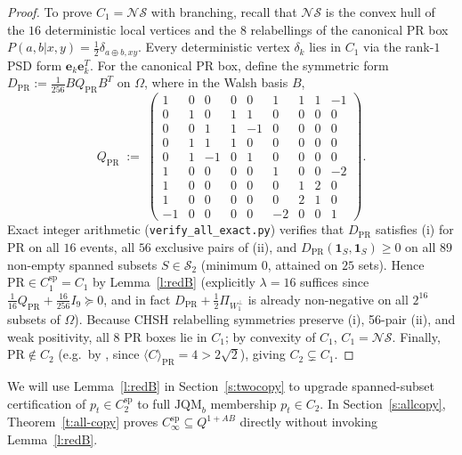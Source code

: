 \documentclass[11pt,a4paper]{article}
\theoremstyle{definition}
\theoremstyle{remark}
\newcommand{\PR}{\mathrm{PR}}
\newcommand{\ind}[1]{\mathbf{1}_{#1}}
\newcommand{\JQMb}{\mathrm{JQM}_b}
\newcommand{\QAB}{Q^{1+AB}}
\newcommand{\NS}{\mathcal{NS}}
\begin{document}
\begin{proof}
To prove $C_1 = \NS$ with branching, recall that $\NS$ is the convex hull of the $16$ deterministic local vertices and the $8$ relabellings of the canonical $\PR$ box $P(a,b|x,y) = \frac{1}{2}\delta_{a \oplus b, xy}$. Every deterministic vertex $\delta_k$ lies in $C_1$ via the rank-$1$ PSD form $\mathbf{e}_k \mathbf{e}_k^T$. For the canonical $\PR$ box, define the symmetric form $D_{\PR} := \frac{1}{256} B Q_{\PR} B^T$ on $\Omega$, where in the Walsh basis $B$,
{\small
\[
  Q_{\PR} \;:=\;
  \begin{pmatrix}
    1 & 0 &  0 & 0 &  0 &  1 & 1 & 1 & -1 \\
    0 & 1 &  0 & 1 &  1 &  0 & 0 & 0 &  0 \\
    0 & 0 &  1 & 1 & -1 &  0 & 0 & 0 &  0 \\
    0 & 1 &  1 & 1 &  0 &  0 & 0 & 0 &  0 \\
    0 & 1 & -1 & 0 &  1 &  0 & 0 & 0 &  0 \\
    1 & 0 &  0 & 0 &  0 &  1 & 0 & 0 & -2 \\
    1 & 0 &  0 & 0 &  0 &  0 & 1 & 2 &  0 \\
    1 & 0 &  0 & 0 &  0 &  0 & 2 & 1 &  0 \\
   -1 & 0 &  0 & 0 &  0 & -2 & 0 & 0 &  1
  \end{pmatrix}.
\]}
Exact integer arithmetic (\texttt{verify\_all\_exact.py}) verifies that $D_{\PR}$ satisfies (i) for $\PR$ on all $16$ events, all $56$ exclusive pairs of (ii), and $D_{\PR}(\ind S, \ind S) \ge 0$ on all $89$ non-empty spanned subsets $S \in \mathcal{S}_2$ (minimum $0$, attained on $25$ sets). Hence $\PR \in C_1^{\mathrm{sp}} = C_1$ by Lemma~\ref{l:redB} (explicitly $\lambda = 16$ suffices since $\frac{1}{16} Q_{\PR} + \frac{16}{256} I_9 \succeq 0$, and in fact $D_{\PR} + \frac{1}{2}\Pi_{W_1^\perp}$ is already non-negative on all $2^{16}$ subsets of $\Omega$). Because CHSH relabelling symmetries preserve (i), 56-pair (ii), and weak positivity, all $8$ PR boxes lie in $C_1$; by convexity of $C_1$, $C_1 = \NS$. Finally, $\PR \notin C_2$ (e.g.\ by \cite{Henson,TwoCopy}, since $\langle C \rangle_{\PR} = 4 > 2\sqrt{2}$), giving $C_2 \subsetneq C_1$.
\end{proof}

We will use Lemma~\ref{l:redB} in Section~\ref{s:twocopy} to upgrade spanned-subset certification of $p_t \in C_2^{\mathrm{sp}}$ to full $\JQMb$ membership $p_t \in C_2$. In Section~\ref{s:allcopy}, Theorem~\ref{t:all-copy} proves $C_\infty^{\mathrm{sp}} \subseteq \QAB$ directly without invoking Lemma~\ref{l:redB}.
\end{document}
